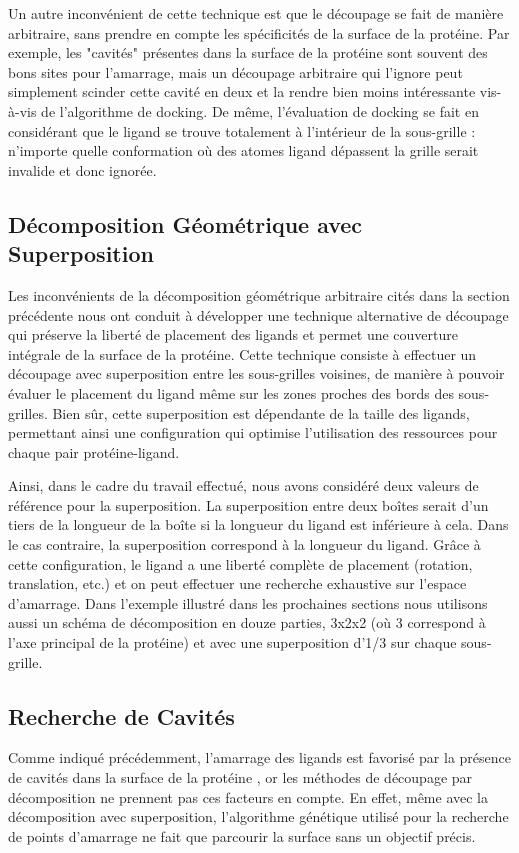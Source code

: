 Un autre inconvénient de cette technique est que le découpage se fait de manière arbitraire, sans prendre en compte les spécificités de la surface de la protéine. Par exemple, les "cavités" présentes dans la surface de la protéine sont souvent des bons sites pour l'amarrage, mais un découpage arbitraire qui l'ignore peut simplement scinder cette cavité en deux et la rendre bien moins intéressante vis-à-vis de l'algorithme de docking. De même, l'évaluation de docking se fait en considérant que le ligand se trouve totalement à l'intérieur de la sous-grille : n'importe quelle conformation où des atomes ligand dépassent la grille serait invalide et donc ignorée. 

\subsection{Décomposition Géométrique avec Superposition}
Les inconvénients de la décomposition géométrique arbitraire cités dans la section précédente nous ont conduit à développer une technique alternative de découpage qui préserve la liberté de placement des ligands et permet une couverture intégrale de la surface de la protéine. Cette technique consiste à effectuer un découpage avec superposition entre les sous-grilles voisines, de manière à pouvoir évaluer le placement du ligand même sur les zones proches des bords des sous-grilles. Bien sûr, cette superposition est dépendante de la taille des ligands, permettant ainsi une configuration qui optimise l'utilisation des ressources pour chaque pair protéine-ligand. 

Ainsi, dans le cadre du travail effectué, nous avons considéré deux valeurs de référence pour la superposition. La superposition entre deux boîtes serait d'un tiers de la longueur de la boîte si la longueur du ligand est inférieure à cela. Dans le cas contraire, la superposition correspond à la longueur du ligand. Grâce à cette configuration, le ligand a une liberté complète de placement (rotation, translation, etc.) et on peut effectuer une recherche exhaustive sur l'espace d'amarrage. Dans l'exemple illustré dans les prochaines sections nous utilisons aussi un schéma de décomposition en douze parties, 3x2x2 (où 3 correspond à l'axe principal de la protéine) et avec une superposition d'1/3 sur chaque sous-grille. 

\subsection{Recherche de Cavités}
Comme indiqué précédemment, l'amarrage des ligands est favorisé par la présence de cavités dans la surface de la protéine \cite{Ghersi2009,Hetenyi2011}, or les méthodes de découpage par décomposition ne prennent pas ces facteurs en compte. En effet, même avec la décomposition avec superposition, l'algorithme génétique utilisé pour la recherche de points d'amarrage ne fait que parcourir la surface sans un objectif précis. 

